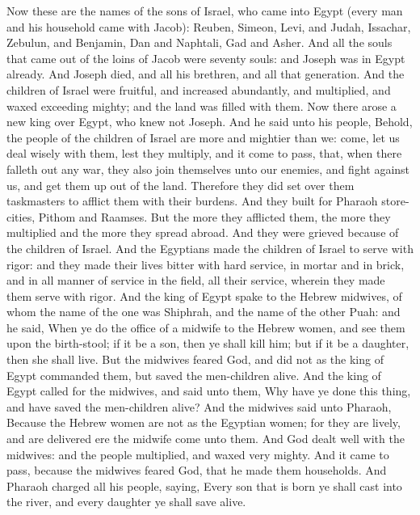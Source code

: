 


Now these are the names of the sons of Israel, who came into Egypt (every man and his household came with Jacob): Reuben, Simeon, Levi, and Judah, Issachar, Zebulun, and Benjamin, Dan and Naphtali, Gad and Asher. And all the souls that came out of the loins of Jacob were seventy souls: and Joseph was in Egypt already. And Joseph died, and all his brethren, and all that generation. And the children of Israel were fruitful, and increased abundantly, and multiplied, and waxed exceeding mighty; and the land was filled with them.  Now there arose a new king over Egypt, who knew not Joseph. And he said unto his people, Behold, the people of the children of Israel are more and mightier than we: come, let us deal wisely with them, lest they multiply, and it come to pass, that, when there falleth out any war, they also join themselves unto our enemies, and fight against us, and get them up out of the land. Therefore they did set over them taskmasters to afflict them with their burdens. And they built for Pharaoh store-cities, Pithom and Raamses. But the more they afflicted them, the more they multiplied and the more they spread abroad. And they were grieved because of the children of Israel. And the Egyptians made the children of Israel to serve with rigor: and they made their lives bitter with hard service, in mortar and in brick, and in all manner of service in the field, all their service, wherein they made them serve with rigor.  And the king of Egypt spake to the Hebrew midwives, of whom the name of the one was Shiphrah, and the name of the other Puah: and he said, When ye do the office of a midwife to the Hebrew women, and see them upon the birth-stool; if it be a son, then ye shall kill him; but if it be a daughter, then she shall live. But the midwives feared God, and did not as the king of Egypt commanded them, but saved the men-children alive. And the king of Egypt called for the midwives, and said unto them, Why have ye done this thing, and have saved the men-children alive? And the midwives said unto Pharaoh, Because the Hebrew women are not as the Egyptian women; for they are lively, and are delivered ere the midwife come unto them. And God dealt well with the midwives: and the people multiplied, and waxed very mighty. And it came to pass, because the midwives feared God, that he made them households. And Pharaoh charged all his people, saying, Every son that is born ye shall cast into the river, and every daughter ye shall save alive. 

